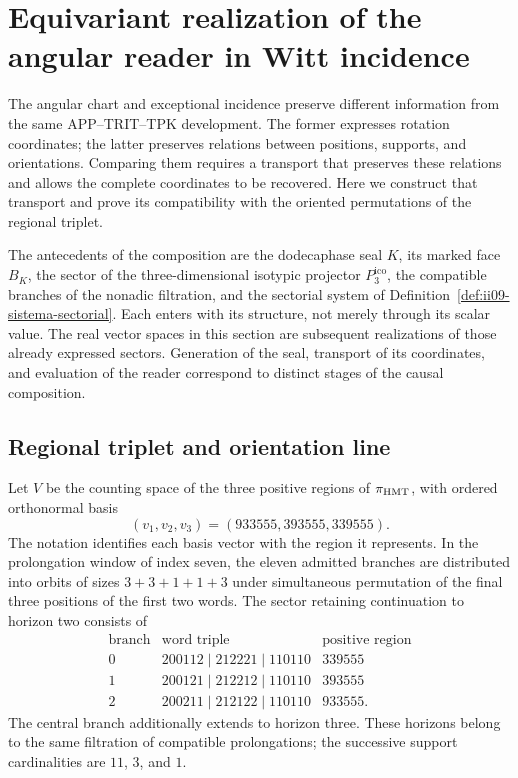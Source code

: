 \section{Equivariant realization of the angular reader in Witt incidence}
\label{sec:ii-enlace-angular-witt}

The angular chart and exceptional incidence preserve different information
from the same APP--TRIT--TPK development. The former expresses rotation
coordinates; the latter preserves relations between positions, supports, and
orientations. Comparing them requires a transport that preserves these
relations and allows the complete coordinates to be recovered. Here we construct
that transport and prove its compatibility with the oriented
permutations of the regional triplet.

The antecedents of the composition are the dodecaphase seal \(K\), its
marked face \(B_K\), the sector of the three-dimensional isotypic projector
\(P_3^{\mathrm{ico}}\), the compatible
branches of the nonadic filtration, and the sectorial system of
Definition~\ref{def:ii09-sistema-sectorial}. Each enters with its
structure, not merely through its scalar value. The real vector
spaces in this section are subsequent realizations of those
already expressed sectors. Generation of the seal, transport of its
coordinates, and evaluation of the reader correspond to distinct stages of
the causal composition.

\subsection{Regional triplet and orientation line}

Let \(V\) be the counting space of the three positive regions of
\(\pi_{\rm HMT}\), with ordered orthonormal basis
\[
 (v_1,v_2,v_3)=(933555,393555,339555).
\]
The notation identifies each basis vector with the region it represents.
In the prolongation window of index seven, the eleven admitted branches
are distributed into orbits of sizes \(3+3+1+1+3\) under simultaneous
permutation of the final three positions of the first two words.
The sector retaining continuation to horizon two consists of
\[
\begin{array}{c|c|c}
\text{branch}&\text{word triple}&\text{positive region}\\ \hline
0&200112\mid212221\mid110110&339555\\
1&200121\mid212212\mid110110&393555\\
2&200211\mid212122\mid110110&933555.
\end{array}
\]
The central branch additionally extends to horizon three. These
horizons belong to the same filtration of compatible prolongations;
the successive support cardinalities are \(11\), \(3\), and \(1\).

